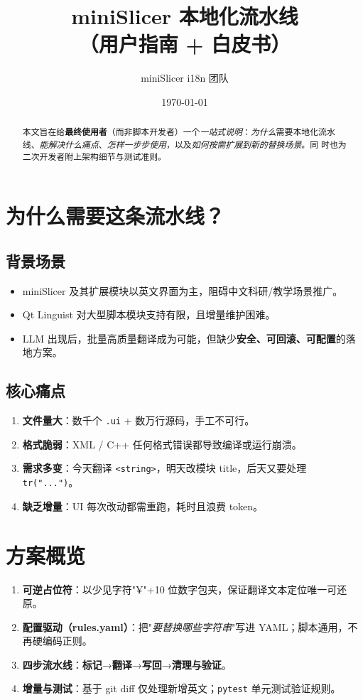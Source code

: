 \documentclass[12pt]{article}
\title{miniSlicer 本地化流水线\\（用户指南 + 白皮书）}
\author{miniSlicer i18n 团队}
\date{\today}
\begin{document}
\maketitle

\begin{abstract}
本文旨在给\textbf{最终使用者}（而非脚本开发者）一个\emph{一站式说明}：\emph{为什么}需要本地化流水线、\emph{能解决什么痛点}、\emph{怎样一步步使用}，以及\emph{如何按需扩展到新的替换场景}。同 时也为二次开发者附上架构细节与测试准则。
\end{abstract}

\section{为什么需要这条流水线？}
\subsection{背景场景}
\begin{itemize}
  \item miniSlicer 及其扩展模块以英文界面为主，阻碍中文科研/教学场景推广。
  \item Qt Linguist 对大型脚本模块支持有限，且增量维护困难。
  \item LLM 出现后，批量高质量翻译成为可能，但缺少\textbf{安全、可回滚、可配置}的落地方案。
\end{itemize}

\subsection{核心痛点}
\begin{enumerate}
  \item \textbf{文件量大}：数千个 \texttt{.ui} + 数万行源码，手工不可行。
  \item \textbf{格式脆弱}：XML / C++ 任何格式错误都导致编译或运行崩溃。
  \item \textbf{需求多变}：今天翻译 \lstinline|<string>|，明天改模块 title，后天又要处理 \lstinline|tr("...")|。
  \item \textbf{缺乏增量}：UI 每次改动都需重跑，耗时且浪费 token。
\end{enumerate}

\section{方案概览}
\begin{enumerate}
  \item \textbf{可逆占位符}：以少见字符"¥"+10 位数字包夹，保证翻译文本定位唯一可还原。
  \item \textbf{配置驱动（rules.yaml）}：把"\emph{要替换哪些字符串}"写进 YAML；脚本通用，不再硬编码正则。
  \item \textbf{四步流水线}：\textbf{标记}→\textbf{翻译}→\textbf{写回}→\textbf{清理与验证}。
  \item \textbf{增量与测试}：基于 git diff 仅处理新增英文；\lstinline|pytest| 单元测试验证规则。
\end{enumerate}
\end{document}
